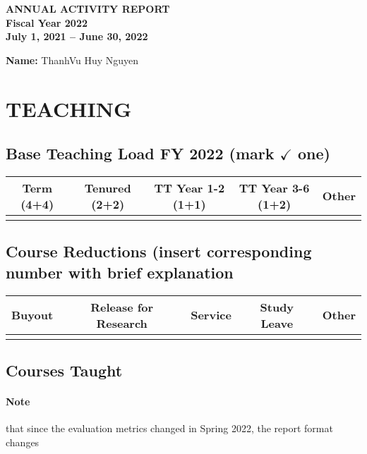 \documentclass[11pt]{article}
\newcommand{\fy}{2022}
\newcommand{\fyperiod}{July 1, 2021 -- June 30, 2022}
\newcommand{\myname}{ThanhVu Huy Nguyen}
\begin{document}
\newpage
\begin{center}
  \textbf{ANNUAL ACTIVITY REPORT\\
    Fiscal Year \fy{}\\
    \fyperiod}
\end{center}

\textbf{Name:} \myname{}

\section{TEACHING}

\subsection{Base Teaching Load FY \fy{} (mark $\checkmark$ one)}
\begin{tabular}{ccccc}
    \toprule
    \textbf{Term (4+4)}& \textbf{Tenured (2+2)}& \textbf{TT Year 1-2 (1+1)}& \textbf{TT Year 3-6 (1+2)}&\textbf{Other}\\
      \midrule
      & & & & \\
      \bottomrule
  \end{tabular}

\subsection{Course Reductions (insert corresponding number with brief explanation}
\begin{center}
  \begin{tabular}{ccccc}
    \toprule
    \textbf{Buyout}&\textbf{Release for Research}&\textbf{Service}&\textbf{Study Leave}&\textbf{Other}\\
    \midrule
    & & & & \\
    \bottomrule
  \end{tabular}
\end{center}


\subsection{Courses Taught}
\paragraph{Note} that since the evaluation metrics changed in Spring 2022, the report format changes
\end{document}
